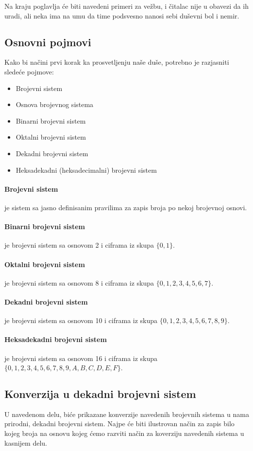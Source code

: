 \documentclass[a4paper]{article}
\begin{document}
Na kraju poglavlja će biti navedeni primeri za vežbu, i čitalac nije u obavezi da ih uradi, ali neka ima na umu da time podsvesno nanosi sebi duševni bol i nemir.

\subsection{Osnovni pojmovi}
Kako bi načini prvi korak ka prosvetljenju naše duše, potrebno je razjasniti sledeće pojmove:
\begin{itemize}
	\item Brojevni sistem
	\item Osnova brojevnog sistema
	\item Binarni brojevni sistem
	\item Oktalni brojevni sistem
	\item Dekadni brojevni sistem
	\item Heksadekadni (heksadecimalni) brojevni sistem
\end{itemize}

\paragraph{Brojevni sistem}je sistem sa jasno definisanim pravilima za zapis broja po nekoj brojevnoj osnovi.
\paragraph{Binarni brojevni sistem}je brojevni sistem sa osnovom 2 i ciframa iz skupa $\{0,1\}$.
\paragraph{Oktalni brojevni sistem}je brojevni sistem sa osnovom 8 i ciframa iz skupa $\{0,1,2,3,4,5,6,7\}$.
\paragraph{Dekadni brojevni sistem}je brojevni sistem sa osnovom 10 i ciframa iz skupa $\{0,1,2,3,4,5,6,7,8,9\}$.
\paragraph{Heksadekadni brojevni sistem}je brojevni sistem sa osnovom 16 i ciframa iz skupa $\{0,1,2,3,4,5,6,7,8,9, A, B, C, D, E, F\}$.



\subsection{Konverzija u dekadni brojevni sistem}
U navedenom delu, biće prikazane konverzije navedenih brojevnih sistema u nama prirodni, dekadni brojevni sistem. Najpe će biti ilustrovan način za zapis bilo kojeg
broja na osnovu kojeg ćemo razviti način za koverziju navedenih sistema u kasnijem delu.
\end{document}
